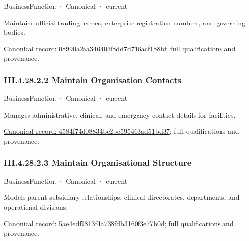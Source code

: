 \label{element:08990a2aa346403f8dd7d716acf188bf}
{\small BusinessFunction · Canonical · current}\par

Maintains official trading names, enterprise registration numbers, and governing bodies.


{\footnotesize \href{../../../../continuum/business/business-function/08990a2aa346403f8dd7d716acf188bf.md}{Canonical record: 08990a2aa346403f8dd7d716acf188bf}; full qualifications and provenance.}\par
\subsubsection*{III.4.28.2.2 Maintain Organisation Contacts}
\label{navigation:III.4.28.2.2}

\label{element:4584f74d08834bc2bc595463ad51bd37}
{\small BusinessFunction · Canonical · current}\par

Manages administrative, clinical, and emergency contact details for facilities.


{\footnotesize \href{../../../../continuum/business/business-function/4584f74d08834bc2bc595463ad51bd37.md}{Canonical record: 4584f74d08834bc2bc595463ad51bd37}; full qualifications and provenance.}\par
\subsubsection*{III.4.28.2.3 Maintain Organisational Structure}
\label{navigation:III.4.28.2.3}

\label{element:5ae4edf0813f4a738fdb3160f3e77b0d}
{\small BusinessFunction · Canonical · current}\par

Models parent-subsidiary relationships, clinical directorates, departments, and operational divisions.


{\footnotesize \href{../../../../continuum/business/business-function/5ae4edf0813f4a738fdb3160f3e77b0d.md}{Canonical record: 5ae4edf0813f4a738fdb3160f3e77b0d}; full qualifications and provenance.}\par

